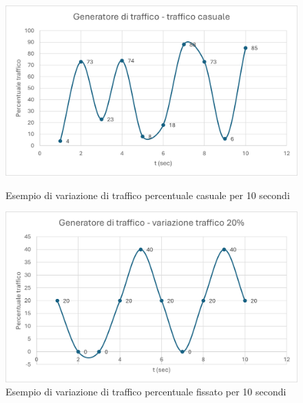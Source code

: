 \documentclass[binding=0.6cm]{sapthesis}
\begin{document}
\begin{figure}[ht]
    \centering
    \begin{minipage}{0.48\textwidth}
      \includegraphics[width=\linewidth]{immagini/generatore_traffico_random.png}
      \caption{Esempio di variazione di traffico percentuale casuale per 10 secondi}
      \label{fig:generatore_traffico_random}
    \end{minipage}\hfill
    \begin{minipage}{0.48\textwidth}
      \includegraphics[width=\linewidth]{immagini/generatore_traffico_fissato.png}
      \caption{Esempio di variazione di traffico percentuale fissato per 10 secondi}
      \label{fig:generatore_traffico_fissato}
    \end{minipage}
\end{figure}
\end{document}
